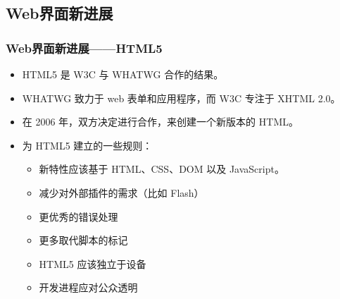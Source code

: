 \documentclass{beamer}
\begin{document}
\subsection{Web界面新进展}
\begin{frame}
	\frametitle{Web界面新进展——HTML5}
	\beamertemplatetransparentcovereddynamicmedium
	\begin{itemize}
		\item HTML5 是 W3C 与 WHATWG 合作的结果。~\cite{hickson2007html}
		\item WHATWG 致力于 web 表单和应用程序，而 W3C 专注于 XHTML 2.0。
		\item 在 2006 年，双方决定进行合作，来创建一个新版本的 HTML。
		\pause
		\item 为 HTML5 建立的一些规则：
		\begin{itemize}
			\item 新特性应该基于 HTML、CSS、DOM 以及 JavaScript。
			\item 减少对外部插件的需求（比如 Flash）
			\item 更优秀的错误处理
			\item 更多取代脚本的标记
			\item HTML5 应该独立于设备
			\item 开发进程应对公众透明
		\end{itemize}
	\end{itemize}
\end{frame}
\end{document}
